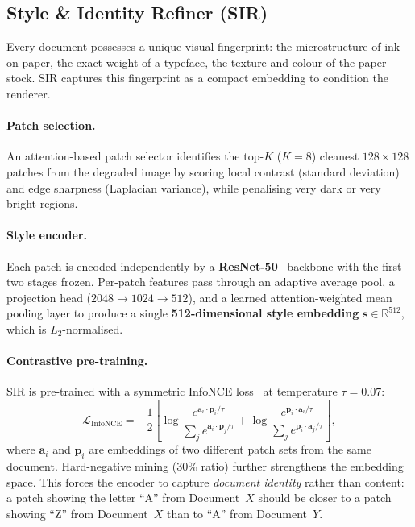 \documentclass[conference]{IEEEtran}
\newcommand{\sir}{\textsc{SIR}}
\newcommand{\RR}{\mathbb{R}}
\begin{document}
\subsection{Style \& Identity Refiner (\sir)}
\label{sec:sir}

Every document possesses a unique visual fingerprint: the microstructure of ink on
paper, the exact weight of a typeface, the texture and colour of the paper stock.
\sir{} captures this fingerprint as a compact embedding to condition the renderer.

\paragraph{Patch selection.}
An attention-based patch selector identifies the top-$K$ ($K{=}8$) cleanest
$128{\times}128$ patches from the degraded image by scoring local contrast (standard
deviation) and edge sharpness (Laplacian variance), while penalising very dark or
very bright regions.

\paragraph{Style encoder.}
Each patch is encoded independently by a \textbf{ResNet-50}~\cite{he2016resnet}
backbone with the first two stages frozen.  Per-patch features pass through an
adaptive average pool, a projection head
($2048 \rightarrow 1024 \rightarrow 512$), and a learned attention-weighted mean
pooling layer to produce a single \textbf{512-dimensional style embedding}
$\mathbf{s} \in \RR^{512}$, which is $L_2$-normalised.

\paragraph{Contrastive pre-training.}
\sir{} is pre-trained with a symmetric InfoNCE loss~\cite{oord2018infonce} at
temperature $\tau{=}0.07$:
\begin{equation}
  \mathcal{L}_\text{InfoNCE} = -\frac{1}{2}\left[
    \log\frac{e^{\mathbf{a}_i \cdot \mathbf{p}_i / \tau}}
             {\sum_j e^{\mathbf{a}_i \cdot \mathbf{p}_j / \tau}}
    + \log\frac{e^{\mathbf{p}_i \cdot \mathbf{a}_i / \tau}}
               {\sum_j e^{\mathbf{p}_i \cdot \mathbf{a}_j / \tau}}
  \right],
  \label{eq:infonce}
\end{equation}
where $\mathbf{a}_i$ and $\mathbf{p}_i$ are embeddings of two different patch sets
from the same document.  Hard-negative mining (30\% ratio) further strengthens the
embedding space.  This forces the encoder to capture \emph{document identity} rather
than content: a patch showing the letter ``A'' from Document~$X$ should be closer to
a patch showing ``Z'' from Document~$X$ than to ``A'' from Document~$Y$.
\end{document}
